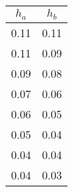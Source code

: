 \begin{large}\begin{tabular}{|c|c|}
\hline
$h_a$&$h_b$\\\hline
0.11&0.11\\\hline
0.11&0.09\\\hline
0.09&0.08\\\hline
0.07&0.06\\\hline
0.06&0.05\\\hline
0.05&0.04\\\hline
0.04&0.04\\\hline
0.04&0.03\\\hline
\end{tabular}
\end{large}